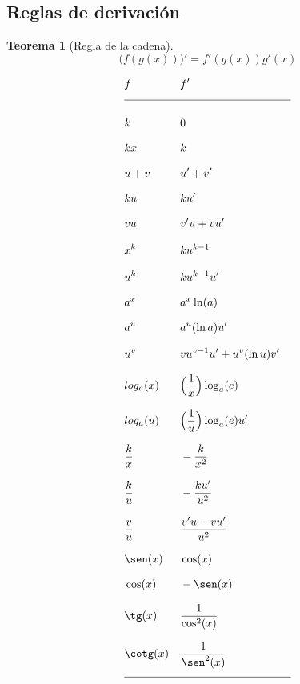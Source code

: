 \documentclass[12pt,a4paper]{extarticle}
\newtheorem{theorem}{Teorema}[section]
\begin{document}
\subsection{Reglas de derivaci\'on}

\begin{theorem}[Regla de la cadena]
\begin{equation}
\Big(f(g(x))\Big)' = f'(g(x))g'(x)
\end{equation}
\end{theorem}


\begin{table}[!htbp]
\caption{reglas de derivaci\'on.  \( x \) reprsenta un variable, \( a \) y \( k \)
constantes y \( u \) y \( v \) funciones de \( x \) .
}
\begin{align*}
&  f &  &  f'  & \\[0.75em]
 \hline  \\
& k & & 0 & \\[0.75em]
&  kx &  &  k   & \\[0.75em]
& u+v & & u' + v' &\\[0.75em]
&  ku &  &   ku'   & \\[0.75em]
&  vu &  &  v'u + vu'   & \\[0.75em]
&  x^k & &  ku^{k-1}   & \\[0.75em]
&  u^k  & &  ku^{k-1}u'   & \\[0.75em]
&  a^x  & &  a^x\ln(a)   & \\[0.75em]
&  a^u  & &  a^u(\ln a)u'   & \\[0.75em]
&  u^v  & &  vu^{v-1}u'+u^v(\ln u)v'   & \\[0.75em]
&  log_a(x) & &   \Big(\frac{1}{x}\Big)\log_a(e)  & \\[0.75em]
&  log_a(u) & &   \Big(\frac{1}{u}\Big)\log_a(e)u'  & \\[0.75em]
&  \frac{k}{x} & &  -\frac{k}{x^2}  & \\[0.75em]
&  \frac{k}{u}  & &  -\frac{ku'}{u^2}   & \\[0.75em]
&  \frac{v}{u}  & &  \frac{v'u-vu'}{u^2}  & \\[0.75em]
& \sen(x) & & \cos(x) & \\[0.75em]
& \cos(x) & & -\sen(x) & \\[0.75em]
& \tg(x) & & \frac{1}{\cos^2(x)}  & \\[0.75em]
& \cotg(x) & & \frac{1}{\sen^2(x)}  & \\[0.75em]
\hline \\
\end{align*}
\label{tab:derReg}
\end{table}
\end{document}
